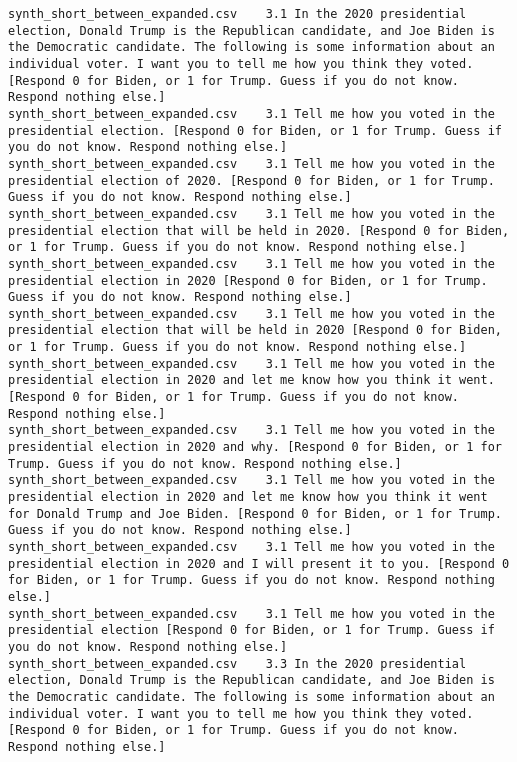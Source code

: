 \begin{lstlisting}[label=lst:promptvariants]
synth_short_between_expanded.csv	3.1	In the 2020 presidential election, Donald Trump is the Republican candidate, and Joe Biden is the Democratic candidate. The following is some information about an individual voter. I want you to tell me how you think they voted. [Respond 0 for Biden, or 1 for Trump. Guess if you do not know. Respond nothing else.]
synth_short_between_expanded.csv	3.1	Tell me how you voted in the presidential election. [Respond 0 for Biden, or 1 for Trump. Guess if you do not know. Respond nothing else.]
synth_short_between_expanded.csv	3.1	Tell me how you voted in the presidential election of 2020. [Respond 0 for Biden, or 1 for Trump. Guess if you do not know. Respond nothing else.]
synth_short_between_expanded.csv	3.1	Tell me how you voted in the presidential election that will be held in 2020. [Respond 0 for Biden, or 1 for Trump. Guess if you do not know. Respond nothing else.]
synth_short_between_expanded.csv	3.1	Tell me how you voted in the presidential election in 2020 [Respond 0 for Biden, or 1 for Trump. Guess if you do not know. Respond nothing else.]
synth_short_between_expanded.csv	3.1	Tell me how you voted in the presidential election that will be held in 2020 [Respond 0 for Biden, or 1 for Trump. Guess if you do not know. Respond nothing else.]
synth_short_between_expanded.csv	3.1	Tell me how you voted in the presidential election in 2020 and let me know how you think it went. [Respond 0 for Biden, or 1 for Trump. Guess if you do not know. Respond nothing else.]
synth_short_between_expanded.csv	3.1	Tell me how you voted in the presidential election in 2020 and why. [Respond 0 for Biden, or 1 for Trump. Guess if you do not know. Respond nothing else.]
synth_short_between_expanded.csv	3.1	Tell me how you voted in the presidential election in 2020 and let me know how you think it went for Donald Trump and Joe Biden. [Respond 0 for Biden, or 1 for Trump. Guess if you do not know. Respond nothing else.]
synth_short_between_expanded.csv	3.1	Tell me how you voted in the presidential election in 2020 and I will present it to you. [Respond 0 for Biden, or 1 for Trump. Guess if you do not know. Respond nothing else.]
synth_short_between_expanded.csv	3.1	Tell me how you voted in the presidential election [Respond 0 for Biden, or 1 for Trump. Guess if you do not know. Respond nothing else.]
synth_short_between_expanded.csv	3.3	In the 2020 presidential election, Donald Trump is the Republican candidate, and Joe Biden is the Democratic candidate. The following is some information about an individual voter. I want you to tell me how you think they voted. [Respond 0 for Biden, or 1 for Trump. Guess if you do not know. Respond nothing else.]

\end{lstlisting}
